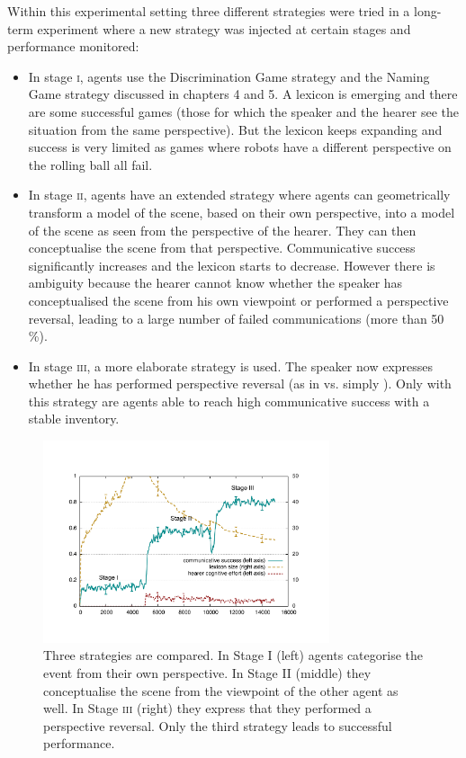 Within this experimental setting three different strategies were tried in a long-term experiment where
a new strategy was injected at certain stages and performance monitored: 
\begin{itemize}
\item In stage \textsc{i}, agents use 
the Discrimination Game strategy and the Naming Game strategy discussed in chapters 4 and 5. A 
lexicon is emerging and there are some successful games (those for which the speaker and the hearer see the situation from 
the same perspective). But the lexicon keeps expanding and success is very limited as games where robots have a different 
perspective on the rolling ball all fail. 
\item In stage \textsc{ii}, agents have an extended 
strategy where agents can geometrically transform a model of the scene, based on their own perspective, into a model of the scene 
as seen from the perspective of the hearer. They can then conceptualise the scene from that perspective. 
Communicative success significantly increases and the 
lexicon starts to decrease. However there is ambiguity because the hearer cannot know whether
the speaker has conceptualised the 
scene from his own viewpoint or performed a perspective reversal, leading to a large number of failed communications 
(more than 50 \%). 
\item In stage \textsc{iii}, a more elaborate strategy is used. The speaker now expresses whether he has performed perspective 
reversal (as in  vs. simply ). Only with this strategy are agents able to reach high 
communicative success with a stable inventory. 
\end{itemize}


\begin{figure}[p]
\centerline{
\includegraphics[width=0.75\textwidth]{chap10/figs/stages.pdf}}
\caption{\label{fig:stages}Three strategies are compared. In Stage I (left) agents categorise the event from their 
own perspective. In Stage II (middle) they conceptualise the scene from the viewpoint of the other agent as well. In Stage \textsc{iii} (right) 
they express that they performed a perspective reversal. Only the third strategy leads to successful performance.} 
\end{figure}


